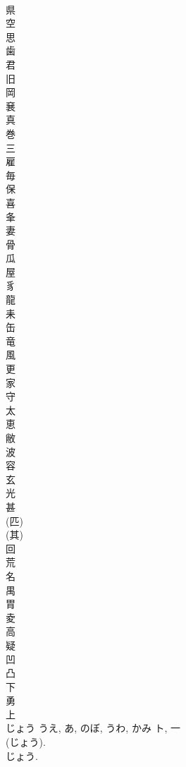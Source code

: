 \documentclass[8pt]{extreport}
\begin{document}
\begin{CJK}{UTF8}{min}
\\	県	
\\	空	
\\	思	
\\	歯	
\\	君	
\\	旧	
\\	岡	
\\	㐮	
\\	真	
\\	巻	
\\	三	
\\	雇	
\\	毎	
\\	保	
\\	喜	
\\	夆	
\\	妻	
\\	骨	
\\	瓜	
\\	屋	
\\	豸	
\\	龍	
\\	耒	
\\	缶	
\\	竜	
\\	風	
\\	更	
\\	家	
\\	守	
\\	太	
\\	恵	
\\	敝	
\\	波	
\\	容	
\\	玄	
\\	光	
\\	甚	
\\	(匹) 
\\	(其) 
\\	回	
\\	荒	
\\	名	
\\	禺	
\\	胃	
\\	夌	
\\	高	
\\	疑	
\\	凹	
\\	凸	
\\	下	
\\	勇	
\\	上	
\\	じょう	うえ, あ, のぼ, うわ, かみ	ト, 一	
\\	(じょう).	
\\	じょう. 

\end{CJK}
\end{document}
